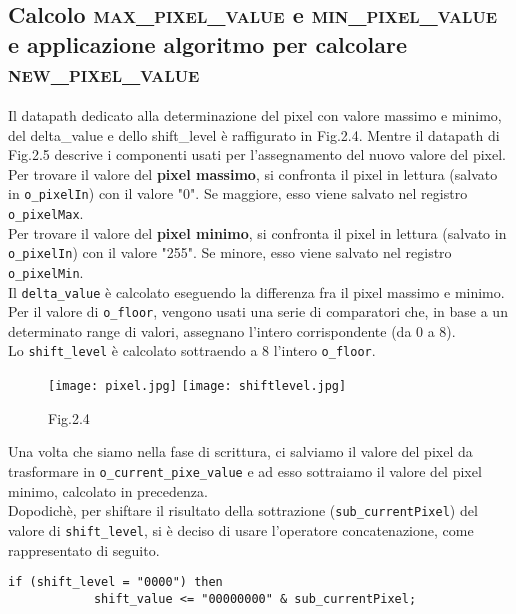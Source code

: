 \documentclass[12pt, table, xcdraw]{article}
\begin{document}
\newpage
\subsection{Calcolo \textsc{max\_pixel\_value} e \textsc{min\_pixel\_value} e applicazione algoritmo per calcolare \textsc{new\_pixel\_value}}
Il datapath dedicato alla determinazione del pixel con valore massimo e minimo, del delta\_value e dello shift\_level è raffigurato in Fig.2.4. Mentre il datapath di Fig.2.5 descrive i componenti usati per l'assegnamento del nuovo valore del pixel.\\
Per trovare il valore del \textbf{pixel massimo}, si confronta il pixel in lettura (salvato in \texttt{o\_pixelIn}) con il valore "0". Se maggiore, esso viene salvato nel registro \texttt{o\_pixelMax}. \\
Per trovare il valore del \textbf{pixel minimo}, si confronta il pixel in lettura (salvato in \texttt{o\_pixelIn}) con il valore "255". Se minore, esso viene salvato nel registro \texttt{o\_pixelMin}.\\
Il \texttt{delta\_value} è calcolato eseguendo la differenza fra il pixel massimo e minimo.\\
Per il valore di \texttt{o\_floor}, vengono usati una serie di comparatori che, in base a un determinato range di valori, assegnano l'intero corrispondente (da 0 a 8).\\
Lo \texttt{shift\_level} è calcolato sottraendo a 8 l'intero \texttt{o\_floor}.\\



\begin{figure}[h!]
\hspace*{-1.1in}
  \texttt{[image: pixel.jpg]}
 \texttt{[image: shiftlevel.jpg]}
\caption*{Fig.2.4}
\end{figure}


Una volta che siamo nella fase di scrittura, ci salviamo il valore del pixel da trasformare in \texttt{o\_current\_pixe\_value} e ad esso sottraiamo il valore del pixel minimo, calcolato in precedenza.\\
Dopodichè, per shiftare il risultato della sottrazione (\texttt{sub\_currentPixel}) del valore di \texttt{shift\_level}, si è deciso di usare l'operatore concatenazione, come rappresentato di seguito.

\begin{center}
\begin{lstlisting}
if (shift_level = "0000") then
            shift_value <= "00000000" & sub_currentPixel;
\end{lstlisting}
\end{center}
\end{document}
